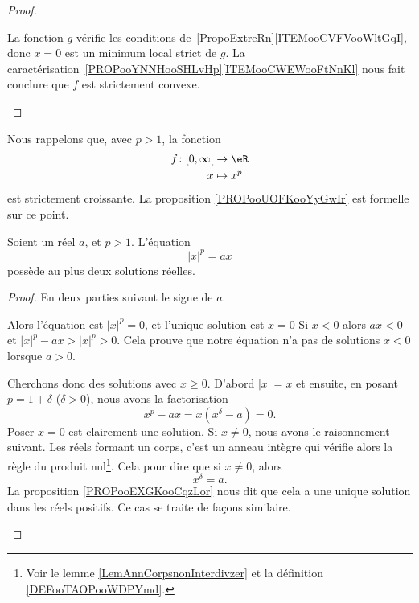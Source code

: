 \begin{proof}
\begin{subproof}
		\spitem[\ref{ITEMooDGISooPlRLOd}]

		La fonction \( g\) vérifie les conditions de~\ref{PropoExtreRn}\ref{ITEMooCVFVooWltGqI}, donc \( x=0\) est un minimum local strict de \( g\). La caractérisation~\ref{PROPooYNNHooSHLvHp}\ref{ITEMooCWEWooFtNnKl} nous fait conclure que \( f\) est strictement convexe.

	\end{subproof}
\end{proof}

\begin{normaltext}
	Nous rappelons que, avec \( p>1\), la fonction
	\begin{equation}
		\begin{aligned}
			f\colon \mathopen[ 0 , \infty \mathclose[ & \to \eR     \\
			x                                         & \mapsto x^p
		\end{aligned}
	\end{equation}
	est strictement croissante. La proposition \ref{PROPooUOFKooYyGwIr} est formelle sur ce point.
\end{normaltext}

\begin{lemma}
	Soient un réel \( a\), et \( p>1\). L'équation
	\begin{equation}
		| x |^p=ax
	\end{equation}
	possède au plus deux solutions réelles.
\end{lemma}

\begin{proof}
	En deux parties suivant le signe de \( a\).
	\begin{subproof}
		\spitem[Si \( a=0\)]
		Alors l'équation est \( | x |^p=0\), et l'unique solution est \( x=0\)
		\spitem[Si \( a>0\)]
		Si \( x<0\) alors \( ax<0\) et \( | x |^p-ax>| x |^p>0\). Cela prouve que notre équation n'a pas de solutions \( x<0\) lorsque \( a>0\).

		Cherchons donc des solutions avec \( x\geq 0\). D'abord \( | x |=x\) et ensuite, en posant \( p=1+\delta\) (\( \delta>0\)), nous avons la factorisation
		\begin{equation}
			x^p-ax=x(x^{\delta}-a)=0.
		\end{equation}
		Poser \( x=0\) est clairement une solution. Si \( x\neq 0\), nous avons le raisonnement suivant. Les réels formant un corps, c'est un anneau intègre qui vérifie alors la règle du produit nul\footnote{Voir le lemme \ref{LemAnnCorpsnonInterdivzer} et la définition \ref{DEFooTAOPooWDPYmd}.}. Cela pour dire que si \( x\neq 0\), alors
		\begin{equation}
			x^{\delta}=a.
		\end{equation}
		La proposition \ref{PROPooEXGKooCqzLor} nous dit que cela a une unique solution dans les réels positifs.
		\spitem[Si \( a<0\)] Ce cas se traite de façons similaire.
	\end{subproof}
\end{proof}

